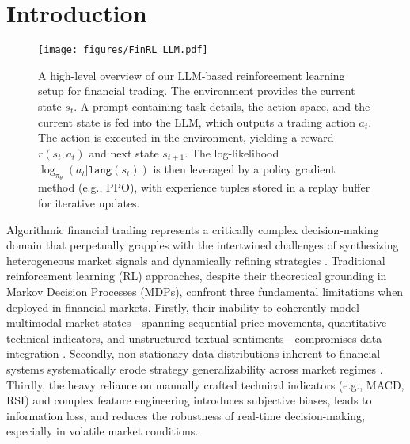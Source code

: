 \section{Introduction}

\begin{figure*}
     \centering
     \texttt{[image: figures/FinRL\_LLM.pdf]}
     \caption{A high-level overview of our LLM-based reinforcement learning setup for financial trading. The environment provides the current state 
$s_t$. A prompt containing task details, the action space, and the current state is fed into the LLM, which outputs a trading action 
$a_t$. The action is executed in the environment, yielding a reward 
$r(s_t, a_t)$ and next state 
$s_{t+1}$. The log-likelihood 
$\log_{\pi_\theta}(a_t|\texttt{lang}(s_t))$ is then leveraged by a policy gradient method (e.g., PPO), with experience tuples stored in a replay buffer for iterative updates.}
     \label{fig:FinRL_LLM}
 \end{figure*}
Algorithmic financial trading represents a critically complex decision-making domain that perpetually grapples with the intertwined challenges of synthesizing heterogeneous market signals and dynamically refining strategies \cite{hambly2023recent,yu2024fincon,li2023tradinggpt}. Traditional reinforcement learning (RL) approaches, despite their theoretical grounding in Markov Decision Processes (MDPs), confront three fundamental limitations when deployed in financial markets. Firstly, their inability to coherently model multimodal market states—spanning sequential price movements, quantitative technical indicators, and unstructured textual sentiments—compromises data integration \cite{Zhang2019DeepRL,nassirtoussi2014text}. Secondly, non-stationary data distributions inherent to financial systems systematically erode strategy generalizability across market regimes \cite{Zhang2019DeepRL}. Thirdly, the heavy reliance on manually crafted technical indicators (e.g., MACD, RSI) and complex feature engineering \cite{liang2018adversarial} introduces subjective biases, leads to information loss, and reduces the robustness of real-time decision-making, especially in volatile market conditions.

